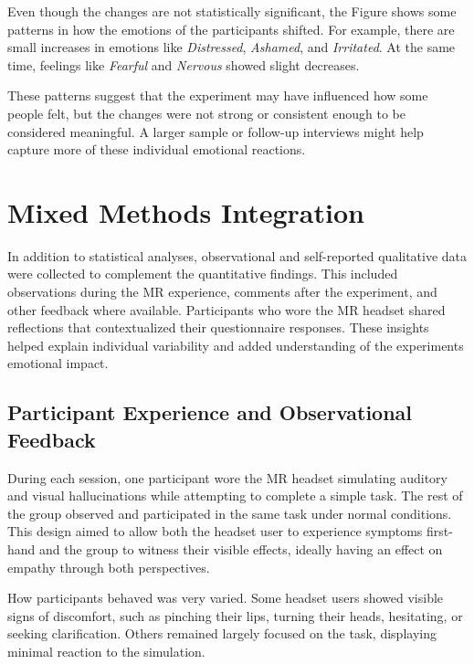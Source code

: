 Even though the changes are not statistically significant, the Figure shows some patterns in how the emotions of the participants shifted. For example, there are small increases in emotions like \textit{Distressed}, \textit{Ashamed}, and \textit{Irritated}. At the same time, feelings like \textit{Fearful} and \textit{Nervous} showed slight decreases.

\vspace{1em}

These patterns suggest that the experiment may have influenced how some people felt, but the changes were not strong or consistent enough to be considered meaningful. A larger sample or follow-up interviews might help capture more of these individual emotional reactions.

\section{Mixed Methods Integration}
In addition to statistical analyses, observational and self-reported qualitative data were collected to complement the quantitative findings. This included observations during the MR experience, comments after the experiment, and other feedback where available. Participants who wore the MR headset shared reflections that contextualized their questionnaire responses. These insights helped explain individual variability and added understanding of the experiments emotional impact.


\subsection{Participant Experience and Observational Feedback}

During each session, one participant wore the MR headset simulating auditory and visual hallucinations while attempting to complete a simple task. The rest of the group observed and participated in the same task under normal conditions. This design aimed to allow both the headset user to experience symptoms first-hand and the group to witness their visible effects, ideally having an effect on empathy through both perspectives.

\vspace{1em}

How participants behaved was very varied. Some headset users showed visible signs of discomfort, such as pinching their lips, turning their heads, hesitating, or seeking clarification. Others remained largely focused on the task, displaying minimal reaction to the simulation.

